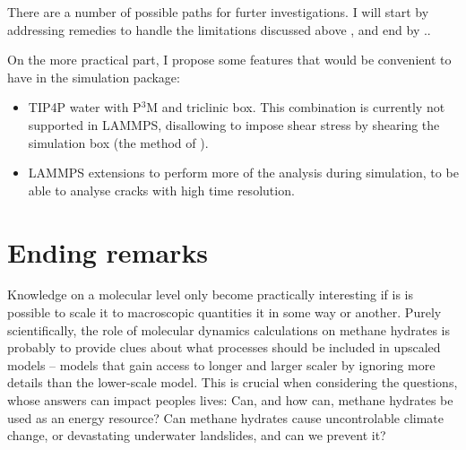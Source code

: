 There are a number of possible paths for furter investigations. I will start by addressing remedies to handle the limitations discussed above , and end by ..

On the more practical part, I propose some features that would be convenient to have in the simulation package:
\begin{itemize}
\item TIP4P water with P$^3$M and triclinic box. This combination is currently not supported in LAMMPS, disallowing to impose shear stress by shearing the simulation box (the method of \citet{Parrinello1981}).
\item LAMMPS extensions to perform more of the analysis during simulation, to be able to analyse cracks with high time resolution.
\end{itemize}
 
\section{Ending remarks}
Knowledge on a molecular level only become practically interesting if is is possible to scale it to macroscopic quantities it in some way or another. Purely scientifically, the role of molecular dynamics calculations on methane hydrates is probably to provide clues about what processes should be included in upscaled models -- models that gain access to longer and larger scaler by ignoring more details than the lower-scale model. This is crucial when considering the questions, whose answers can impact peoples lives: Can, and how can, methane hydrates be used as an energy resource? Can methane hydrates cause uncontrolable climate change, or devastating underwater landslides, and can we prevent it? 